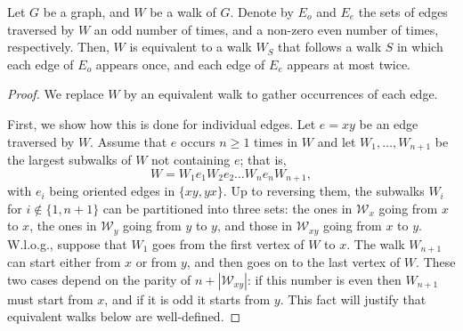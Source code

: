 \documentclass[10pt,a4paper]{amsart}
\begin{document}
\begin{proposition}\label{proposition:walk_shapes}
  Let $G$ be a graph, and $W$ be a walk of $G$. Denote by $E_o$ and $E_e$ the sets of edges traversed by $W$
  an odd number of times, and a non-zero even number of times, respectively. Then, $W$ is equivalent to a walk $W_S$ that follows a walk $S$ in which each edge of $E_o$ appears once, and each edge of $E_e$ appears at most twice.
\end{proposition}

\begin{proof}
  We replace $W$ by an equivalent walk to gather occurrences of each edge.
  
  First, we show how this is done for individual edges.
  Let $e=xy$ be an edge traversed by $W$. Assume that $e$ occurs $n\ge 1$
  times in $W$ and let $W_1,\dots,W_{n+1}$ be the largest subwalks of $W$ not containing $e$; that is,
  \[
    W=W_1e_1W_2e_2\dots W_ne_nW_{n+1},
  \]
  with $e_i$ being oriented edges in $\{xy,yx\}$. Up to reversing them, the subwalks $W_i$ for $i\notin\{1,n+1\}$ can be partitioned into three sets:
  the ones in $\mathcal{W}_x$ going from $x$ to $x$, the ones in $\mathcal{W}_y$ going from $y$ to $y$, and those in $\mathcal{W}_{xy}$
  going from $x$ to $y$. W.l.o.g., suppose that $W_1$ goes from the first vertex of $W$ to $x$. The walk $W_{n+1}$ can start either from $x$ or from $y$, and then goes on to the last vertex of $W$. These two cases depend on the parity of $n+|\mathcal W_{xy}|$: if this number is even then $W_{n+1}$ must start from $x$, and if it is odd it starts from $y$. This fact will justify that equivalent walks below are well-defined.
  

\end{proof}
\end{document}
